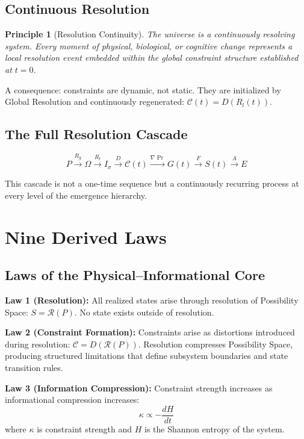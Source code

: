 \documentclass[12pt, a4paper]{article}
\newtheorem{principle}{Principle}[section]
\begin{document}
\subsection{Continuous Resolution}

\begin{principle}[Resolution Continuity]
The universe is a continuously resolving system. Every moment of physical, biological,
or cognitive change represents a local resolution event embedded within the global
constraint structure established at $t = 0$.
\end{principle}

A consequence: constraints are dynamic, not static. They are initialized by Global
Resolution and continuously regenerated: $\mathcal{C}(t) = D(R_l(t))$.

\subsection{The Full Resolution Cascade}

\[
  P \xrightarrow{R_g} \Omega
  \xrightarrow{R_l} I_\sigma
  \xrightarrow{D} \mathcal{C}(t)
  \xrightarrow{\nabla\Pr} G(t)
  \xrightarrow{F} S(t)
  \xrightarrow{A} E
\]

This cascade is not a one-time sequence but a continuously recurring process at every
level of the emergence hierarchy.

\section{Nine Derived Laws}

\subsection{Laws of the Physical--Informational Core}

\textbf{Law 1 (Resolution):} All realized states arise through resolution of Possibility Space:
$S = \mathcal{R}(P)$. No state exists outside of resolution.

\textbf{Law 2 (Constraint Formation):} Constraints arise as distortions introduced during
resolution: $\mathcal{C} = D(\mathcal{R}(P))$. Resolution compresses Possibility Space,
producing structured limitations that define subsystem boundaries and state transition rules.

\textbf{Law 3 (Information Compression):} Constraint strength increases as informational
compression increases:
\[ \kappa \propto -\frac{dH}{dt} \]
where $\kappa$ is constraint strength and $H$ is the Shannon entropy of the system.
\end{document}
